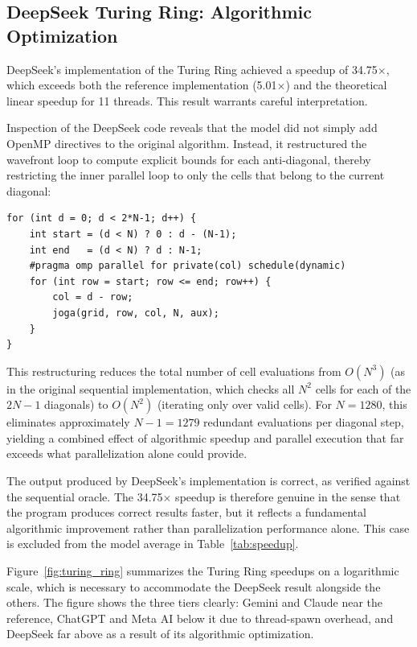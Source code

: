 \subsection{DeepSeek Turing Ring: Algorithmic Optimization}
\label{subsec:deepseek_tr}

DeepSeek's implementation of the Turing Ring achieved a speedup of 34.75$\times$, which exceeds both the reference implementation (5.01$\times$) and the theoretical linear speedup for 11 threads. This result warrants careful interpretation.

Inspection of the DeepSeek code reveals that the model did not simply add OpenMP directives to the original algorithm. Instead, it restructured the wavefront loop to compute explicit bounds for each anti-diagonal, thereby restricting the inner parallel loop to only the cells that belong to the current diagonal:

\begin{verbatim}
for (int d = 0; d < 2*N-1; d++) {
    int start = (d < N) ? 0 : d - (N-1);
    int end   = (d < N) ? d : N-1;
    #pragma omp parallel for private(col) schedule(dynamic)
    for (int row = start; row <= end; row++) {
        col = d - row;
        joga(grid, row, col, N, aux);
    }
}
\end{verbatim}

This restructuring reduces the total number of cell evaluations from $O(N^3)$ (as in the original sequential implementation, which checks all $N^2$ cells for each of the $2N-1$ diagonals) to $O(N^2)$ (iterating only over valid cells). For $N=1280$, this eliminates approximately $N-1 = 1279$ redundant evaluations per diagonal step, yielding a combined effect of algorithmic speedup and parallel execution that far exceeds what parallelization alone could provide.

The output produced by DeepSeek's implementation is correct, as verified against the sequential oracle. The 34.75$\times$ speedup is therefore genuine in the sense that the program produces correct results faster, but it reflects a fundamental algorithmic improvement rather than parallelization performance alone. This case is excluded from the model average in Table~\ref{tab:speedup}.

Figure~\ref{fig:turing_ring} summarizes the Turing Ring speedups on a logarithmic scale, which is necessary to accommodate the DeepSeek result alongside the others. The figure shows the three tiers clearly: Gemini and Claude near the reference, ChatGPT and Meta AI below it due to thread-spawn overhead, and DeepSeek far above as a result of its algorithmic optimization.

